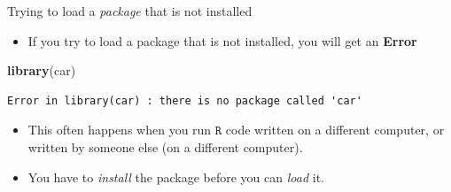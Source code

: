 \documentclass[
  11pt,
  ignorenonframetext,
]{beamer}
\newenvironment{Shaded}{\begin{snugshade}}{\end{snugshade}}
\newcommand{\FunctionTok}[1]{\textcolor[rgb]{0.13,0.29,0.53}{\textbf{#1}}}
\newcommand{\NormalTok}[1]{#1}
\providecommand{\tightlist}{%
  \setlength{\itemsep}{0pt}\setlength{\parskip}{0pt}}
\newcommand{\R}{\texttt{R}}
\begin{document}
\begin{frame}[fragile]{Trying to load a \emph{package} that is not
installed}
\protect\hypertarget{trying-to-load-a-package-that-is-not-installed}{}
\begin{itemize}
\tightlist
\item
  If you try to load a package that is not installed, you will get an
  \textbf{Error}
\end{itemize}

\begin{Shaded}
\begin{Highlighting}[]
\FunctionTok{library}\NormalTok{(car)}
\end{Highlighting}
\end{Shaded}

\begin{verbatim}
Error in library(car) : there is no package called 'car'
\end{verbatim}

\begin{itemize}
\item
  This often happens when you run \(\R\) code written on a different
  computer, or written by someone else (on a different computer).
\item
  You have to \emph{install} the package before you can \emph{load} it.
\end{itemize}
\end{frame}
\end{document}
